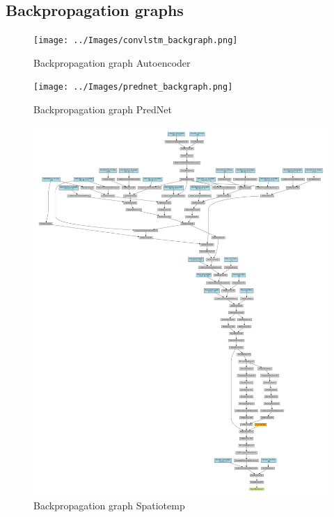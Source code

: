  \subsection*{Backpropagation graphs}
  \begin{figure}[H]
   \texttt{[image: ../Images/convlstm\_backgraph.png]}
   \centering
   \caption{Backpropagation graph Autoencoder}
   \label{fig:backprop_autoenc}
  \end{figure}\noindent
  \begin{figure}[H]
   \texttt{[image: ../Images/prednet\_backgraph.png]}
   \centering
   \caption{Backpropagation graph PredNet}
   \label{fig:backprop_prednet}
  \end{figure}\noindent
  \begin{figure}[H]
   \includegraphics[width=1.0\textwidth]{../Images/spatiotemp_backgraph.png}
   \centering
   \caption{Backpropagation graph Spatiotemp}
   \label{fig:backprop_spatio}
  \end{figure}\noindent